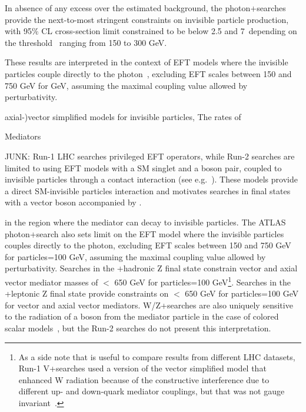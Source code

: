In absence of any excess over the estimated background, the photon+\MET searches provide the next-to-most stringent constraints on invisible particle production, with 95\% CL cross-section limit constrained to be below 2.5 and 7~\fb depending on the \MET threshold~\cite{Aaboud:2017dor} ranging from 150 to 300 GeV. 

These results are interpreted in the context of EFT models where the invisible particles couple directly to the photon~\cite{Petrov:2013nia,Berlin:2014cfa}, excluding EFT scales between 150 and 750 GeV for  GeV, assuming the maximal coupling value allowed by perturbativity. %

axial-)vector simplified models for invisible particles,
The rates of 

Mediators 







JUNK: Run-1 LHC searches privileged EFT operators, while Run-2 searches are limited to using EFT models with a SM singlet and a boson pair, coupled to invisible particles through a contact interaction (see e.g.~\cite{Petrov:2013nia,Berlin:2014cfa}). These models provide a direct SM-invisible particles interaction and motivates searches in final states with a vector boson accompanied by \MET. 


in the region where the mediator can decay to invisible particles. %
The ATLAS photon+\MET search also sets limit on the EFT model where the invisible particles couples directly to the photon, 
excluding EFT scales between 150 and 750 GeV for \minvisible particles=100 GeV, assuming the maximal coupling value allowed by perturbativity. 
Searches in the \MET+hadronic Z final state constrain vector and axial vector mediator
masses of \mmed $<$ 650 GeV for \minvisible particles=100 GeV\footnote{As a side note that is useful to compare results from different LHC datasets, 
Run-1 V+\MET searches used a version of the vector simplified model
that enhanced W radiation because of the constructive interference 
due to different up- and down-quark mediator couplings,
but that was not gauge invariant~\cite{Bell:2015sza,1475-7516-2016-01-051}.}. 
Searches in the \MET+leptonic Z final state provide constraints on 
\mmed $<$ 650 GeV for \minvisible particles=100 GeV for vector and axial vector mediators. 
W/Z+\MET searches are also uniquely sensitive to the radiation of a boson 
from the mediator particle in the case of colored scalar models~\cite{Bell:2012rg}, 
but the Run-2 searches do not present this interpretation. 


